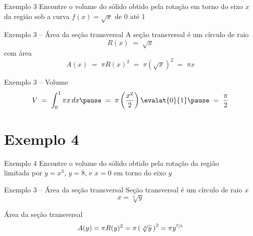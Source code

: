 \begin{frame}{Exemplo 3}
  Encontre o volume do sólido obtido pela rotação em torno do eixo $x$ \\
  da região sob a curva \(f(x) = \sqrt{x}\) de 0 até 1
\end{frame}


\begin{frame}{Exemplo 3 -- Área da seção transversal}
  A seção transversal é um círculo de raio
  \[
    R(x)
    \;=\; \sqrt{x}
  \]
  \pause
  com área
  \[
    A(x)
    \;=\; \pi R(x)^2
    \;=\; \pi \left(\sqrt{x}\right)^2
    \;=\; \pi x
  \]
\end{frame}

\begin{frame}{Exemplo 3 -- Volume}
  \[
    V
    \;=\; \int_0^1 \pi x \, dx
    \pause
    \;=\; \pi \left( \frac{x^2}{2}\right) \evalat{0}{1}
    \pause
    \;=\; \frac{\pi}{2}
  \]
\end{frame}

\section{Exemplo 4}

\begin{frame}{Exemplo 4}
  Encontre o volume do sólido obtido pela rotação da região \\
  limitada por $y = x^3$, $y = 8$, e $x = 0$ em torno do eixo $y$
\end{frame}


\begin{frame}{Exemplo 3 -- Área da seção transversal}
  Seção transversal é um círculo de raio $x$
  \[
    x = \sqrt[3]{y}
  \]

  \pause
  \vspace{\baselineskip}
  Área da seção transversal
  \[
    A(y)
    = \pi R(y)^2
    = \pi \left( \,\sqrt[3]{y}\, \right)^2
    = \pi y^{\sfrac{2}{3}}
  \]
\end{frame}

